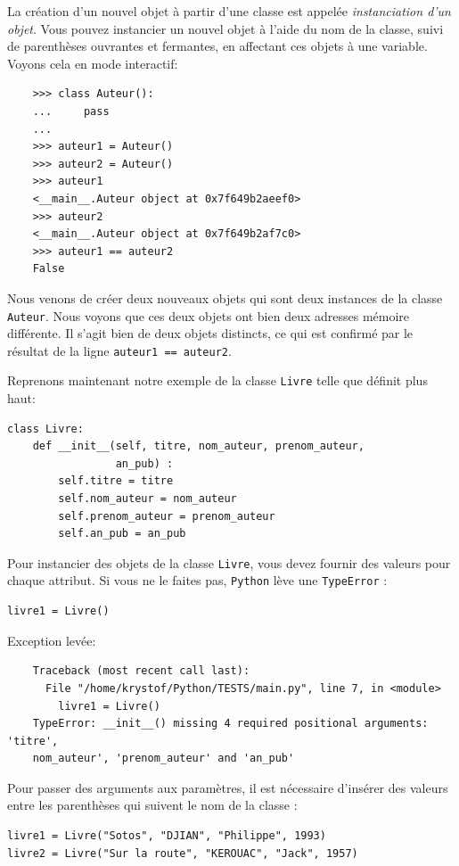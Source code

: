 \documentclass[a4paper,11pt]{book}
\begin{document}
La création d'un nouvel objet à partir d'une classe est appelée \textit{instanciation d'un objet}. Vous pouvez instancier un nouvel objet à l'aide du nom de la classe, suivi de parenthèses ouvrantes et fermantes, en affectant ces objets à une variable. Voyons cela en mode interactif:
\begin{verbatim}
    >>> class Auteur():
    ...     pass
    ... 
    >>> auteur1 = Auteur()
    >>> auteur2 = Auteur()
    >>> auteur1
    <__main__.Auteur object at 0x7f649b2aeef0>
    >>> auteur2
    <__main__.Auteur object at 0x7f649b2af7c0>
    >>> auteur1 == auteur2
    False
\end{verbatim}
\medskip


Nous venons de créer deux nouveaux objets qui sont deux instances de la classe \texttt{Auteur}. Nous voyons que ces deux objets ont bien deux adresses mémoire différente. Il s'agit bien de deux objets distincts, ce qui est confirmé par le résultat de la ligne \texttt{auteur1 == auteur2}.
\medskip

Reprenons maintenant notre exemple de la classe \texttt{Livre} telle que définit plus haut:
\begin{lstlisting}[caption=La classe \texttt{Livre}]
class Livre:
    def __init__(self, titre, nom_auteur, prenom_auteur, 
                 an_pub) :
		self.titre = titre
		self.nom_auteur = nom_auteur
		self.prenom_auteur = prenom_auteur
		self.an_pub = an_pub
\end{lstlisting}
\medskip

Pour instancier des objets de la classe \texttt{Livre}, vous devez fournir des valeurs pour chaque attribut. Si vous ne le faites pas, \texttt{Python} lève une \texttt{TypeError} :
\begin{lstlisting}[caption=Instanciation sans valeur]
livre1 = Livre()
\end{lstlisting}
\medskip

Exception levée:
\begin{verbatim}
    Traceback (most recent call last):
      File "/home/krystof/Python/TESTS/main.py", line 7, in <module>
        livre1 = Livre()
    TypeError: __init__() missing 4 required positional arguments: 'titre', 
    nom_auteur', 'prenom_auteur' and 'an_pub'
\end{verbatim}
\medskip

Pour passer des arguments aux paramètres, il est nécessaire d'insérer des valeurs entre les parenthèses qui suivent le nom de la classe :
\begin{lstlisting}[caption=Instanciation avec valeurs]
livre1 = Livre("Sotos", "DJIAN", "Philippe", 1993)
livre2 = Livre("Sur la route", "KEROUAC", "Jack", 1957)
\end{lstlisting}
\medskip
\end{document}
